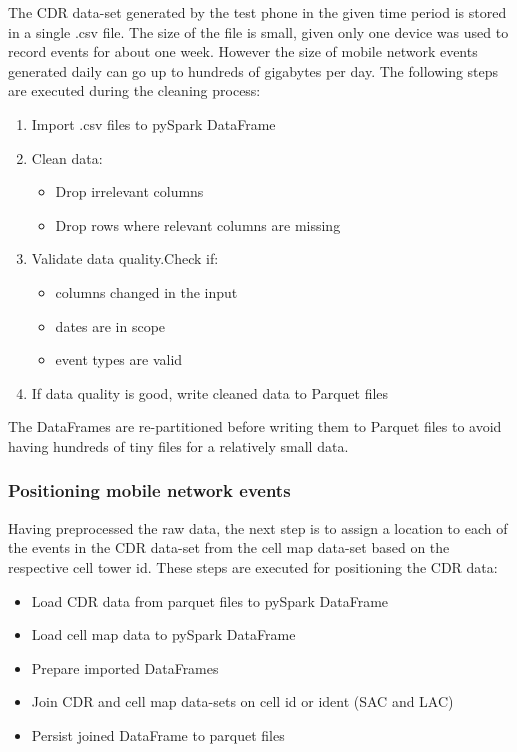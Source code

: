The CDR data-set generated by the test phone in the given time period is stored in a single .csv file. The size of the file is small, given only one device was used to record events for about one week. However the size of mobile network events generated daily can go up to hundreds of gigabytes per day. The following steps are executed during the cleaning process: 
\begin{enumerate}
   \item Import .csv files to pySpark DataFrame
    \item Clean data:
    \begin{itemize}
        \item Drop irrelevant columns
        \item Drop rows where relevant columns are missing
    \end{itemize}
    \item Validate data quality.Check if: 
    \begin{itemize}
        \item columns changed in the input
        \item dates are in scope
        \item event types are valid
    \end{itemize}
    \item If data quality is good, write cleaned data to Parquet files
\end{enumerate}

The DataFrames are re-partitioned before writing them to Parquet files to avoid having hundreds of tiny files for a relatively small data. 

\subsubsection{Positioning mobile network events}
Having preprocessed the raw data, the next step is to assign a location to each of the events in the CDR data-set from the cell map data-set based on the respective cell tower id. 
These steps are executed for positioning the CDR data:
\begin{itemize}
    \item Load CDR data from parquet files to pySpark DataFrame
    \item Load cell map data to pySpark DataFrame
    \item Prepare imported DataFrames
    \item Join CDR and cell map data-sets on cell id or ident (SAC and LAC)
    \item Persist joined DataFrame to parquet files
\end{itemize}

